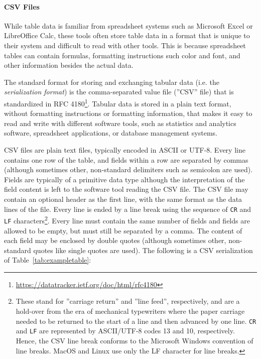 \paragraph*{CSV Files}

While table data is familiar from spreadsheet systems such as Microsoft Excel or LibreOffice Calc, these tools often store table data in a format that is unique to their system and difficult to read with other tools. This is because spreadsheet tables can contain formulas, formatting instructions such color and font, and other information besides the actual data.

The standard format for storing and exchanging tabular data (i.e. the \emph{serialization format}) is the comma-separated value file (''CSV'' file)  that is standardized in RFC 4180\footnote{\url{https://datatracker.ietf.org/doc/html/rfc4180}}. Tabular data is stored in a plain text format, without formatting instructions or formatting information, that makes it easy to read and write with different software tools, such as statistics and analytics software, spreadsheet applications, or database management systems. 

CSV files are plain text files, typically encoded in ASCII or UTF-8. Every line contains one row of the table, and fields within a row are separated by commas (although sometimes other, non-standard delimiters such as semicolon are used). Fields are typically of a primitive data type although the interpretation of the field content is left to the software tool reading the CSV file. The CSV file may contain an optional header as the first line, with the same format as the data lines of the file. Every line is ended by a line break using the sequence of  \texttt{CR} and \texttt{LF} characters\footnote{These stand for ''carriage return'' and ''line feed'', respectively, and are a hold-over from the era of mechanical typewriters where the paper carriage needed to be returned to the start of a line and then advanced by one line. \texttt{CR} and \texttt{LF} are represented by ASCII/UTF-8 codes 13 and 10, respectively. Hence, the CSV line break conforms to the Microsoft Windows convention of line breaks. MacOS and Linux use only the LF character for line breaks.}. Every line must contain the same number of fields and fields are allowed to be empty, but must still be separated by a comma. The content of each field may be enclosed by double quotes (although sometimes other, non-standard quotes like single quotes are used). The following is a CSV serialization of Table~\ref{tab:exampletable}:

